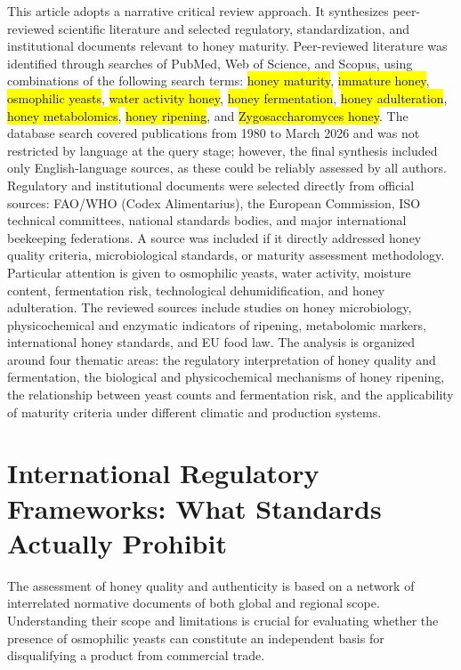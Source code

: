 \documentclass[foods,review,accept,pdftex,moreauthors]{Definitions/mdpi}
\begin{document}
This article adopts a narrative critical review approach. It synthesizes peer-reviewed scientific literature and selected regulatory, standardization, and institutional documents relevant to honey maturity. 
{Peer-reviewed literature was identified through searches of PubMed, Web of Science, and Scopus, using combinations of the following search terms: \hl{honey maturity}, \hl{immature honey}, \hl{osmophilic yeasts}, \hl{water activity honey}, \hl{honey fermentation}, \hl{honey adulteration}, \hl{honey metabolomics}, \hl{honey ripening}, and \hl{Zygosaccharomyces honey}. The database search covered publications from 1980 to March 2026 and was not restricted by language at the query stage; however, the final synthesis included only English-language sources, as these could be reliably assessed by all authors. Regulatory and institutional documents were selected directly from official sources: FAO/WHO (Codex Alimentarius), the European Commission, ISO technical committees, national standards bodies, and major international beekeeping federations. A source was included if it directly addressed honey quality criteria, microbiological standards, or maturity assessment methodology.} Particular attention is given to osmophilic yeasts, water activity, moisture content, fermentation risk, technological dehumidification, and honey adulteration. The reviewed sources include studies on honey microbiology, physicochemical and enzymatic indicators of ripening, metabolomic markers, international honey standards, and EU food law. The analysis is organized around four thematic areas: the regulatory interpretation of honey quality and fermentation, the biological and physicochemical mechanisms of honey ripening, the relationship between yeast counts and fermentation risk, and the applicability of maturity criteria under different climatic and production systems.


\section{International Regulatory Frameworks: What Standards \linebreak  Actually Prohibit}\label{2}

The assessment of honey quality and authenticity is based on a network
of interrelated normative documents of both global and regional scope.
Understanding their scope and limitations is crucial for evaluating
whether the presence of osmophilic yeasts can constitute an independent
basis for disqualifying a product from commercial trade.
\end{document}
